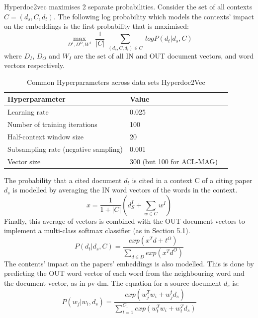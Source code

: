 Hyperdoc2vec maximises 2 separate probabilities. Consider the set of all contexts $C={(d_s, C, d_t)}$. The following log probability which models the contexts' impact on the embeddings is the first probability that is maximised: 
\begin{equation}
    \underset{D^I, D^O, W^I}{\max}\; \frac{1}{|C|} \; \sum\limits_{(d_s,C,d_t) \in C}\: log P(d_t|d_s, C)
\end{equation} 
where $D_I$, $D_O$ and $W_I$ are the set of all IN and OUT document vectors, and word vectors respectively. 
\begin{table}
\centering
\caption{Common Hyperparameters across data sets Hyperdoc2Vec}
\label{tab:hd2vhyperparams}
\begin{footnotesize}
\begin{tabular}{ll@{}c}
\toprule
Hyperparameter & Value \\
\midrule
Learning rate &  0.025 \\
Number of training iterations & 100 \\
Half-context window size & 20 \\
Subsampling rate (negative sampling) &  0.001 \\
Vector size & 300 (but 100 for ACL-MAG) \\
\bottomrule
\end{tabular}
\end{footnotesize}
\end{table}
The probability that a cited document $d_t$ is cited in a context C of a citing paper $d_s$ is modelled by averaging the IN word vectors of the words in the context.
\begin{equation}
    x = \frac{1}{1+|C|} (d_S^I + \sum\limits_{w\in C} w^I)
\end{equation}
Finally, this average of vectors is combined with the OUT document vectors to implement a multi-class softmax classifier (as in Section 5.1).
\begin{equation}
    P(d_t|d_s, C) = \frac{exp(x^T d+t^O)}{\sum\limits_{d\in D} exp(x^Td^O)}
\end{equation}
The contents' impact on the papers' embeddings is also modelled. This is done by predicting the OUT word vector of each word from the neighbouring word and the document vector, as in pv-dm. The equation for a source document $d_s$ is: 
\begin{equation}
    P(w_j|{w_i, d_s}) = \frac{exp(w_j^Tw_i + w_j^td_s)}{\sum_{t=1}^{C_1}{exp(w_t^Tw_i + w_t^Td_s)}}
\end{equation}

